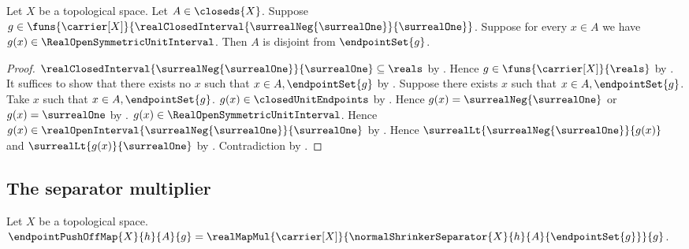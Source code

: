 \begin{theorem}\label{endpoint_set_disjoint_from_fixed_closed_set}
    Let $X$ be a topological space.
    Let $A\in\closeds{X}$.
    Suppose
        $g\in\funs{\carrier[X]}
            {\realClosedInterval
                {\surrealNeg{\surrealOne}}{\surrealOne}}$.
    Suppose for every $x\in A$ we have
        $g(x)\in\RealOpenSymmetricUnitInterval$.
    Then $A$ is disjoint from $\endpointSet{g}$.
\end{theorem}
\begin{proof}
    $\realClosedInterval
        {\surrealNeg{\surrealOne}}{\surrealOne}\subseteq\reals$
        by .
    Hence $g\in\funs{\carrier[X]}{\reals}$
        by .
    It suffices to show that there exists no $x$ such that
        $x\in A,\endpointSet{g}$ by .
    Suppose there exists $x$ such that $x\in A,\endpointSet{g}$.
    Take $x$ such that $x\in A,\endpointSet{g}$.
    $g(x)\in\closedUnitEndpoints$
        by .
    Hence $g(x)=\surrealNeg{\surrealOne}$ or $g(x)=\surrealOne$
        by
        .
    $g(x)\in\RealOpenSymmetricUnitInterval$.
    Hence $g(x)\in\realOpenInterval
        {\surrealNeg{\surrealOne}}{\surrealOne}$
        by .
    Hence
        $\surrealLt{\surrealNeg{\surrealOne}}{g(x)}$ and
        $\surrealLt{g(x)}{\surrealOne}$
        by .
    Contradiction by
        .
\end{proof}

\subsection{The separator multiplier}

\begin{definition}\label{endpoint_push_off_map}
    Let $X$ be a topological space.
    $\endpointPushOffMap{X}{h}{A}{g}
        =\realMapMul{\carrier[X]}
            {\normalShrinkerSeparator{X}{h}{A}{\endpointSet{g}}}{g}$.
\end{definition}

